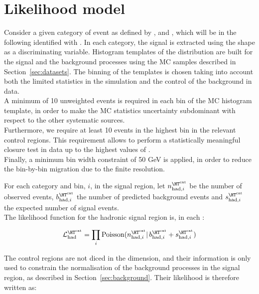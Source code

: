 \section{Likelihood model}
\label{sec:likelihood}

Consider a given category of event as defined by \njet, \nb and \HT, which will be in the following identified with \htcat. 
In each category, the signal is extracted using the \mht shape as a discriminating variable. 
Histogram templates of the \mht distribution are built for the signal and the background processes 
using the MC samples described in Section~\ref{sec:datasets}. 
The binning of the templates is chosen taking into account both the limited statistics in the simulation and 
the control of the background in data. \\
A minimum of 10 unweighted events is required in each bin of the MC histogram template, 
in order to make the MC statistics uncertainty subdominant with respect to the other systematic sources. \\
Furthermore, we require at least 10 events in the highest bin in the relevant control regions.
This requirement allows to perform a statistically meaningful closure test in data up to the highest values of \mht.\\
Finally, a minimum bin width constraint of 50 GeV is applied, 
in order to reduce the bin-by-bin migration due to the finite \mht resolution.

For each category \htcat and \mht bin, $i$, in the signal region, let $n^{\htcat}_{\mathrm{had},i}$ be the number of observed events, $b^{\htcat}_{\mathrm{had},i}$ the number of predicted background events and $s^{\htcat}_{\mathrm{had},i}$ the expected number of signal events. \\
The likelihood function for the hadronic signal region is, in each \htcat:

\begin{equation}
\mathcal{L}^{\htcat}_{\mathrm{had}}=\prod_i \mathrm{Poisson}(n^{\htcat}_{\mathrm{had},i} |\, b^{\htcat}_{\mathrm{had},i} + s^{\htcat}_{\mathrm{had},i})
\label{eq:hadronicLikelihood}
\end{equation}

The control regions are not diced in the \mht dimension, and their information is only used to constrain the normalisation of the background processes 
in the signal region, as described in Section~\ref{sec:background}. 
Their likelihood is therefore written as:

